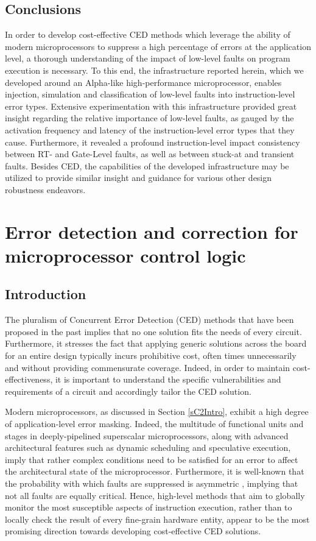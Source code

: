 \documentclass[12pt]{yalephd}
\begin{document}
\section{Conclusions}
In order to develop cost-effective CED methods which leverage the ability of modern microprocessors to suppress a high percentage of errors at the application level, a thorough understanding of the impact of low-level faults on program execution is necessary. To this end, the infrastructure reported herein, which we developed around an Alpha-like high-performance microprocessor, enables injection, simulation and classification of low-level faults into instruction-level error types. Extensive experimentation with this infrastructure provided great insight regarding the relative importance of low-level faults, as gauged by the activation frequency and latency of the instruction-level error types that they cause. Furthermore, it revealed a profound instruction-level impact consistency between RT- and Gate-Level faults, as well as between stuck-at and transient faults. Besides CED, the capabilities of the developed infrastructure may be utilized to provide similar insight and guidance for various other design robustness endeavors.

\chapter{Error detection and correction for microprocessor control logic}\label{sC3}

\section{Introduction}

The pluralism of Concurrent Error Detection (CED) methods that have been proposed in the past implies that no one solution fits the needs of every circuit. Furthermore, it stresses the fact that applying generic solutions across the board for an entire design typically incurs prohibitive cost, often times unnecessarily and without providing commensurate coverage. Indeed, in order to maintain cost-effectiveness, it is important to understand the specific vulnerabilities and requirements of a circuit and accordingly tailor the CED solution.

Modern microprocessors, as discussed in Section \ref{sC2Intro}, exhibit a high degree of application-level error masking. Indeed, the multitude of functional units and stages in deeply-pipelined superscalar microprocessors, along with advanced architectural features such as dynamic scheduling and speculative execution, imply that rather complex conditions need to be satisfied for an error to affect the architectural state of the microprocessor. Furthermore, it is well-known that the probability with which faults are suppressed is asymmetric \cite{Mo03b}, implying that not all faults are equally critical. Hence, high-level methods that aim to globally monitor the most susceptible aspects of instruction execution, rather than to locally check the result of every fine-grain hardware entity, appear to be the most promising direction towards developing cost-effective CED solutions.
\end{document}
